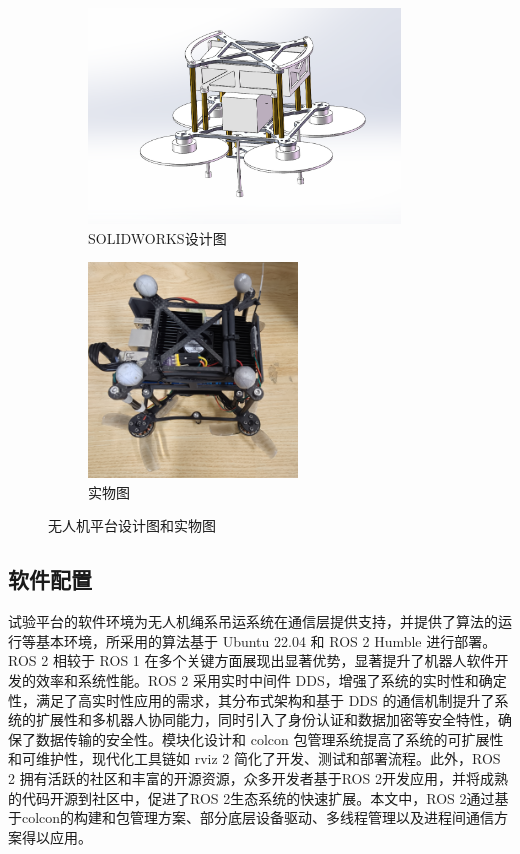 \documentclass[lang=chs, degree=master, blindreview=false, winfonts=true]{yanputhesis}
\begin{document}
\begin{figure}[htb!]
	\centering
	\begin{minipage}[t]{0.96\textwidth}
		\centering
		\begin{subfigure}[t]{0.47\textwidth}
			\centering
			\includegraphics[height = 2.25in]{picture/5_7.jpg}
			\caption{SOLIDWORKS设计图\label{fig.path}}
		\end{subfigure}\hfill
		\begin{subfigure}[t]{0.47\textwidth}
			\centering
			\includegraphics[height = 2.25in]{picture/5_8.jpg}
			\caption{实物图\label{fig.proximity}}
		\end{subfigure}
	\end{minipage}
	\caption{无人机平台设计图和实物图\label{Fig.proximity}}
\end{figure}



\subsection{软件配置}
试验平台的软件环境为无人机绳系吊运系统在通信层提供支持，并提供了算法的运行等基本环境，所采用的算法基于 Ubuntu 22.04 和 ROS 2 Humble 进行部署。ROS 2 相较于 ROS 1 在多个关键方面展现出显著优势，显著提升了机器人软件开发的效率和系统性能。ROS 2 采用实时中间件 DDS，增强了系统的实时性和确定性，满足了高实时性应用的需求，其分布式架构和基于 DDS 的通信机制提升了系统的扩展性和多机器人协同能力，同时引入了身份认证和数据加密等安全特性，确保了数据传输的安全性。模块化设计和 colcon 包管理系统提高了系统的可扩展性和可维护性，现代化工具链如 rviz 2 简化了开发、测试和部署流程。此外，ROS 2 拥有活跃的社区和丰富的开源资源，众多开发者基于ROS 2开发应用，并将成熟的代码开源到社区中，促进了ROS 2生态系统的快速扩展。本文中，ROS 2通过基于colcon的构建和包管理方案、部分底层设备驱动、多线程管理以及进程间通信方案得以应用。
\end{document}
